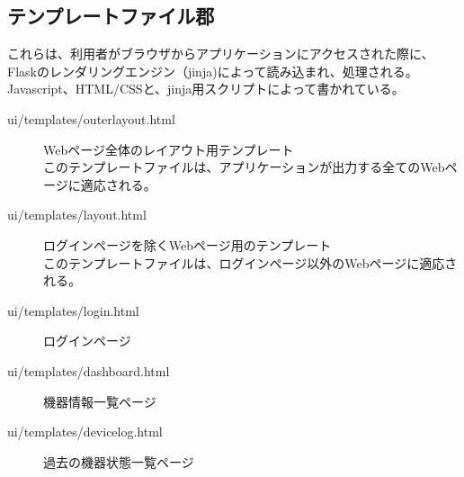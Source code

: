 \subsection*{テンプレートファイル郡}
これらは、利用者がブラウザからアプリケーションにアクセスされた際に、Flaskのレンダリングエンジン（jinja)によって読み込まれ、処理される。
Javascript、HTML/CSSと、jinja用スクリプトによって書かれている。
\begin{description}
\item[ui/templates/outerlayout.html] Webページ全体のレイアウト用テンプレート\\
	このテンプレートファイルは、アプリケーションが出力する全てのWebページに適応される。\\
	
\item[ui/templates/layout.html] ログインページを除くWebページ用のテンプレート\\
	このテンプレートファイルは、ログインページ以外のWebページに適応される。\\
	
\item[ui/templates/login.html] ログインページ\\
	
\item[ui/templates/dashboard.html] 機器情報一覧ページ\\
	
\item[ui/templates/devicelog.html] 過去の機器状態一覧ページ\\
	
\end{description}
